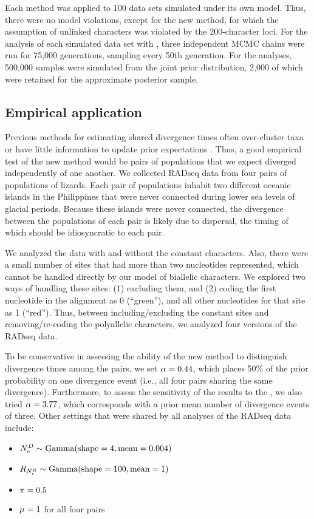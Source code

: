 Each method was applied to 100 data sets simulated under its own model.
Thus, there were no model violations, except for the new method, for which the
assumption of unlinked characters was violated by the 200-character loci.
For the analysis of each simulated data set with \ecoevolity, three independent
MCMC chains were run for 75,000 generations, sampling every 50th generation.
For the \dppmsbayes analyses, 500,000 samples were simulated from the joint
prior distribution, 2,000 of which were retained for the approximate posterior
sample.

\subsection{Empirical application}
Previous methods for estimating shared divergence times often over-cluster taxa
\citep{Oaks2012,Oaks2014reply} or have little information to update prior
expectations \citep{Oaks2014dpp}.
Thus, a good empirical test of the new method would be pairs of populations
that we expect diverged independently of one another.
We collected RADseq data from four pairs of populations of  lizards.
Each pair of populations inhabit two different oceanic islands in the
Philippines that were never connected during lower sea levels of glacial
periods.
Because these islands were never connected, the divergence between the
populations of each pair is likely due to dispersal, the timing of which should
be idiosyncratic to each pair.

We analyzed the data with and without the constant characters.
Also, there were a small number of sites that had more than two nucleotides
represented, which cannot be handled directly by our model of biallelic
characters.
We explored two ways of handling these sites:
(1) excluding them, and
(2) coding the first nucleotide in the alignment as 0 (``green''), and all
other nucleotides for that site as 1 (``red'').
Thus, between including/excluding the constant sites and removing/re-coding the
polyallelic characters, we analyzed four versions of the RADseq data.

To be conservative in assessing the ability of the new method to distinguish
divergence times among the pairs, we set $\concentration = 0.44$, which places
50\% of the prior probability on one divergence event (i.e., all four pairs
sharing the same divergence).
Furthermore, to assess the sensitivity of the results to the \concentration, we
also tried $\concentration = 3.77$, which corresponds with a prior mean number
of divergence events of three.
Other settings that were shared by all analyses of the  RADseq data
include:
\begin{itemize}
    \item $\epopsize[\descendantpopindex{}] \sim \dgamma{4}{0.004}$
    \item $\rootrelativepopsize \sim \dgamma{100}{1}$
    \item $\gfreq = 0.5$
    \item $\murate = 1$ for all four pairs
\end{itemize}

